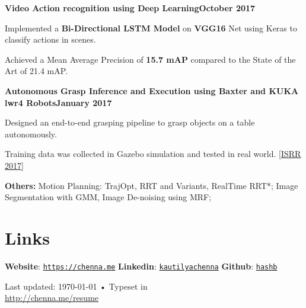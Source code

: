 \documentclass[letterpaper, margin, line, 10.5pt]{resume}
\begin{document}
\begin{resume}
	\textbf{Video Action recognition using Deep Learning}\hfill \textbf{October 2017}
	\begin{list2}
	\item Implemented a \textbf{Bi-Directional LSTM Model} on \textbf{VGG16} Net using Keras to classify actions in scenes.
	\item Achieved a Mean Average Precision of \textbf{15.7 mAP} compared to the State of the Art of 21.4 mAP.
	\end{list2}\vspace{-3.2mm}

	\textbf{Autonomous Grasp Inference and Execution using Baxter and KUKA lwr4 Robots}\hfill \textbf{January 2017}
	\begin{list2}
		\item Designed an end-to-end grasping pipeline to grasp objects on a table autonomously.
		\item Training data was collected in Gazebo simulation and tested in real world. [\href{https://robot-learning.cs.utah.edu/project/grasp\_inference}{ISRR 2017}]
	\end{list2}\vspace{-3.2mm}

	\textbf{Others:} Motion Planning: TrajOpt, RRT and Variants, RealTime RRT*; Image Segmentation with GMM, Image De-noising using MRF; 
	

	
	\sectionseperator
    \section{\myheadingstyle Links}
	\textbf{Website}: \texttt{\href{https://chenna.me}{https://chenna.me}} \hspace{2mm}%
    \textbf{Linkedin}: \texttt{\href{https://www.linkedin.com/in/kautilyachenna/}{kautilyachenna}} \hspace{2mm}%
    \textbf{Github}: \texttt{\href{https://github.com/hashb}{hashb}}
    \vspace{-3.2mm}

\begin{center}
	{\scriptsize  Last updated: \today\- •\- Typeset in \href{}{
			\XeTeX }\\
		\href{http://chenna.me/resume}{http://chenna.me/resume}}
\end{center}

\end{resume}
\end{document}
